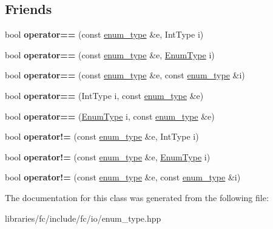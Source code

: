 \subsection*{Friends}
\begin{DoxyCompactItemize}
\item 
\mbox{\label{classfc_1_1enum__type_af1bbc088779a537daf544ab3633eeba2}} 
bool {\bfseries operator==} (const \mbox{\hyperlink{classfc_1_1enum__type}{enum\+\_\+type}} \&e, Int\+Type i)
\item 
\mbox{\label{classfc_1_1enum__type_a1ffc7cb32cd9a60afb25a6e2f7d1034e}} 
bool {\bfseries operator==} (const \mbox{\hyperlink{classfc_1_1enum__type}{enum\+\_\+type}} \&e, \mbox{\hyperlink{struct_enum_type}{Enum\+Type}} i)
\item 
\mbox{\label{classfc_1_1enum__type_a091a7d971ad168253c3ef16098064da1}} 
bool {\bfseries operator==} (const \mbox{\hyperlink{classfc_1_1enum__type}{enum\+\_\+type}} \&e, const \mbox{\hyperlink{classfc_1_1enum__type}{enum\+\_\+type}} \&i)
\item 
\mbox{\label{classfc_1_1enum__type_a2a5c6a3beea82066bc45bbc444258875}} 
bool {\bfseries operator==} (Int\+Type i, const \mbox{\hyperlink{classfc_1_1enum__type}{enum\+\_\+type}} \&e)
\item 
\mbox{\label{classfc_1_1enum__type_a0dd0e3d86ccff831757ff6a3cc8f1065}} 
bool {\bfseries operator==} (\mbox{\hyperlink{struct_enum_type}{Enum\+Type}} i, const \mbox{\hyperlink{classfc_1_1enum__type}{enum\+\_\+type}} \&e)
\item 
\mbox{\label{classfc_1_1enum__type_aadc1d927dadd114ca02a7193d626e2e8}} 
bool {\bfseries operator!=} (const \mbox{\hyperlink{classfc_1_1enum__type}{enum\+\_\+type}} \&e, Int\+Type i)
\item 
\mbox{\label{classfc_1_1enum__type_a30df5bfcf9438a7970e0a839ee9ae896}} 
bool {\bfseries operator!=} (const \mbox{\hyperlink{classfc_1_1enum__type}{enum\+\_\+type}} \&e, \mbox{\hyperlink{struct_enum_type}{Enum\+Type}} i)
\item 
\mbox{\label{classfc_1_1enum__type_aa80e65e65577bc8d4f01cd633218cd8e}} 
bool {\bfseries operator!=} (const \mbox{\hyperlink{classfc_1_1enum__type}{enum\+\_\+type}} \&e, const \mbox{\hyperlink{classfc_1_1enum__type}{enum\+\_\+type}} \&i)
\end{DoxyCompactItemize}


The documentation for this class was generated from the following file\+:\begin{DoxyCompactItemize}
\item 
libraries/fc/include/fc/io/enum\+\_\+type.\+hpp\end{DoxyCompactItemize}
